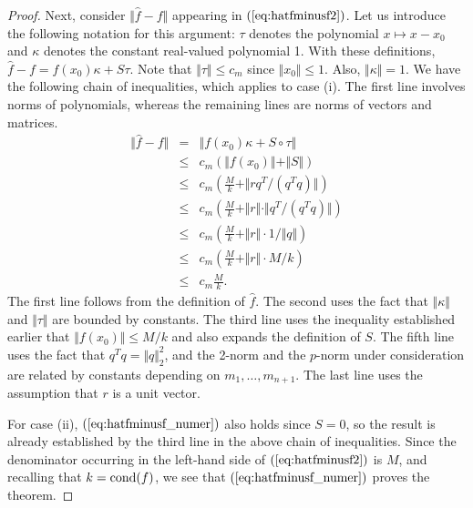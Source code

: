 \documentclass{article}
\newcommand{\cond}[1]{\mathop{\rm{cond}}(#1)}
\newcommand\eref[1]{$(\ref{#1})$}
\begin{document}
\begin{proof}
Next, consider $\Vert\hat f-f\Vert$ appearing in
\eref{eq:hatfminusf2}.  
Let us introduce the following notation for this
argument: $\tau$ denotes the polynomial $x\mapsto x-x_0$ and
$\kappa$ denotes the constant real-valued polynomial 1. 
With these definitions, $\hat f-f=f(x_0)\kappa + S\tau$.
Note that $\Vert \tau\Vert \le c_m$ since $\Vert x_0\Vert\le 1$.
Also, $\Vert \kappa \Vert =1$.
We have the following chain of inequalities,
which applies to case (i).
 The first line involves
norms of polynomials, whereas the remaining lines are norms of vectors
and matrices.  
\begin{eqnarray}
\Vert\hat f-f\Vert & = &
\Vert f(x_0)\kappa + S\circ \tau\Vert \nonumber \\
&\le & c_{m} \left(\Vert f(x_0)\Vert +
\Vert S\Vert\right) \nonumber\\
&\le & c_{m} \left(\frac{M}{k} + 
\Vert rq^T/(q^Tq)\Vert \right)\nonumber \\
&\le& c_{m} \left(\frac{M}{k} +  \Vert r\Vert \cdot \Vert q^T/(q^Tq)\Vert \right)\nonumber\\
&\le &c_{m} \left(\frac{M}{k} +  \Vert r\Vert \cdot 1/\Vert q\Vert \right)\nonumber\\
&\le &c_{m} \left(\frac{M}{k} +  \Vert r\Vert \cdot M/k \right)
\nonumber \\
&\le &c_{m} \frac{M}{k}. \label{eq:hatfminusf_numer}
\end{eqnarray}
The first line follows from the definition of $\hat f$. The second uses the
fact that $\Vert \kappa\Vert$ and $\Vert \tau\Vert$
are bounded by constants.  The third line uses the inequality established
earlier that $\Vert f(x_0)\Vert\le M/k$ and also
expands the definition of $S$.  The fifth line uses the fact that
$q^Tq=\Vert q\Vert^2_2$, and the 2-norm and the $p$-norm under
consideration
are related by constants  depending on $m_1, \ldots, m_{n+1}$.  
The last line uses the assumption that $r$
is a unit vector.

For case (ii), \eref{eq:hatfminusf_numer} also holds since $S=0$, so
the result is already established by the third line in the above chain
of inequalities.
Since the denominator occurring in the left-hand side of
\eref{eq:hatfminusf2} is $M$,
and
recalling that $k=\cond{f}$, we see that
\eref{eq:hatfminusf_numer} proves the theorem.
\end{proof}
\end{document}
